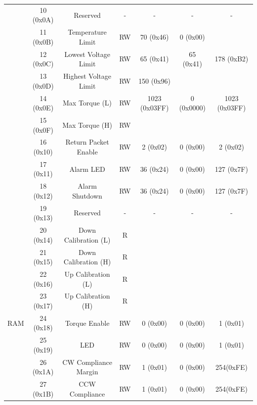 \begin{table}[htbp]
\begin{adjustwidth}{-1.9cm}{-1.5cm}
\begin{tabular}{|c|c|c|c|c|c|c|}
		\multicolumn{ 1}{|c|}{} & 10 (0x0A) & Reserved & - & - & - & - \\ \cline{ 2- 7}
		\multicolumn{ 1}{|c|}{} & 11 (0x0B) & Temperature Limit & RW & 70 (0x46) & 0 (0x00) &  \\ \cline{ 2- 7}
		\multicolumn{ 1}{|c|}{} & 12 (0x0C) & Lowest Voltage Limit & RW & 65 (0x41) & 65 (0x41) & 178 (0xB2) \\ \cline{ 2- 7}
		\multicolumn{ 1}{|c|}{} & 13 (0x0D) & Highest Voltage Limit & RW & 150 (0x96)  &  &  \\ \cline{ 2- 7}
		\multicolumn{ 1}{|c|}{} & 14 (0x0E) & Max Torque (L) & RW & \multicolumn{ 1}{c|}{1023 (0x03FF)} & \multicolumn{ 1}{c|}{ 0 (0x0000) } & \multicolumn{ 1}{c|}{1023 (0x03FF)} \\ \cline{ 2- 4}
		\multicolumn{ 1}{|c|}{} & 15 (0x0F) & Max Torque (H) & RW & \multicolumn{ 1}{c|}{} & \multicolumn{ 1}{c|}{} & \multicolumn{ 1}{c|}{} \\ \cline{ 2- 7}
		\multicolumn{ 1}{|c|}{} & 16 (0x10) & Return Packet Enable & RW & 2 (0x02) & 0 (0x00) & 2 (0x02) \\ \cline{ 2- 7}
		\multicolumn{ 1}{|c|}{} & 17 (0x11) & Alarm LED & RW & 36 (0x24) & 0 (0x00) & 127 (0x7F) \\ \cline{ 2- 7}
		\multicolumn{ 1}{|c|}{} & 18 (0x12) & Alarm Shutdown & RW & 36 (0x24) & 0 (0x00) & 127 (0x7F) \\ \cline{ 2- 7}
		\multicolumn{ 1}{|c|}{} & 19 (0x13) & Reserved & - & - & - & - \\ \cline{ 2- 7}
		\multicolumn{ 1}{|c|}{} & 20 (0x14) & Down Calibration (L) & R &  &  &  \\ \cline{ 2- 7}
		\multicolumn{ 1}{|c|}{} & 21 (0x15) & Down Calibration (H) & R &  &  &  \\ \cline{ 2- 7}
		\multicolumn{ 1}{|c|}{} & 22 (0x16) & Up Calibration (L) & R &  &  &  \\ \cline{ 2- 7}
		\multicolumn{ 1}{|c|}{} & 23 (0x17) & Up Calibration (H) & R &  &  &  \\ \hline
		\multicolumn{ 1}{|c|}{RAM} & 24 (0x18) & Torque Enable & RW & 0 (0x00) & 0 (0x00) & 1 (0x01) \\ \cline{ 2- 7}
		\multicolumn{ 1}{|c|}{} & 25 (0x19) & LED & RW & 0 (0x00) & 0 (0x00) & 1 (0x01) \\ \cline{ 2- 7}
		\multicolumn{ 1}{|c|}{} & 26 (0x1A) & CW Compliance Margin & RW & 1 (0x01) & 0 (0x00) & 254(0xFE) \\ \cline{ 2- 7}
		\multicolumn{ 1}{|c|}{} & 27 (0x1B) & CCW Compliance & RW & 1 (0x01) & 0 (0x00) & 254(0xFE) \\ \cline{ 2- 7}

\end{tabular}
\end{adjustwidth}
\end{table}
